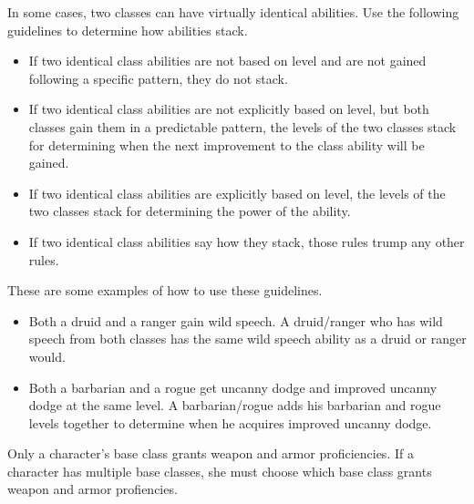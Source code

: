         \par In some cases, two classes can have virtually identical abilities.
        Use the following guidelines to determine how abilities stack.
        \begin{itemize}
            \item If two identical class abilities are not based on level and are not gained following a specific pattern, they do not stack.
            \item If two identical class abilities are not explicitly based on level, but both classes gain them in a predictable pattern, the levels of the two classes stack for determining when the next improvement to the class ability will be gained.
            \item If two identical class abilities are explicitly based on level, the levels of the two classes stack for determining the power of the ability.
            \item If two identical class abilities say how they stack, those rules trump any other rules.
        \end{itemize}
        These are some examples of how to use these guidelines.
        \begin{itemize}
            \item Both a druid and a ranger gain wild speech.
                A druid/ranger who has wild speech from both classes has the same wild speech ability as a druid or ranger would.
            \item Both a barbarian and a rogue get uncanny dodge and improved uncanny dodge at the same level.
                A barbarian/rogue adds his barbarian and rogue levels together to determine when he acquires improved uncanny dodge.
        \end{itemize}

        Only a character's base class grants weapon and armor proficiencies.
        If a character has multiple base classes, she must choose which base class grants weapon and armor profiencies.
